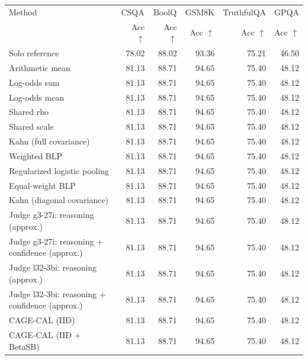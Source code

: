 \begin{tabular}{lrrrrr}
\toprule
Method & \multicolumn{1}{c}{CSQA} & \multicolumn{1}{c}{BoolQ} & \multicolumn{1}{c}{GSM8K} & \multicolumn{1}{c}{TruthfulQA} & \multicolumn{1}{c}{GPQA} \\
 & Acc $\uparrow$ & Acc $\uparrow$ & Acc $\uparrow$ & Acc $\uparrow$ & Acc $\uparrow$ \\
\midrule
Solo reference & 78.02 & 88.02 & 93.36 & 75.21 & 46.50 \\
Arithmetic mean & 81.13 & 88.71 & 94.65 & 75.40 & 48.12 \\
Log-odds sum & 81.13 & 88.71 & 94.65 & 75.40 & 48.12 \\
Log-odds mean & 81.13 & 88.71 & 94.65 & 75.40 & 48.12 \\
Shared rho & 81.13 & 88.71 & 94.65 & 75.40 & 48.12 \\
Shared scale & 81.13 & 88.71 & 94.65 & 75.40 & 48.12 \\
Kahn (full covariance) & 81.13 & 88.71 & 94.65 & 75.40 & 48.12 \\
Weighted BLP & 81.13 & 88.71 & 94.65 & 75.40 & 48.12 \\
Regularized logistic pooling & 81.13 & 88.71 & 94.65 & 75.40 & 48.12 \\
Equal-weight BLP & 81.13 & 88.71 & 94.65 & 75.40 & 48.12 \\
Kahn (diagonal covariance) & 81.13 & 88.71 & 94.65 & 75.40 & 48.12 \\
Judge g3-27i: reasoning (approx.) & 81.13 & 88.71 & 94.65 & 75.40 & 48.12 \\
Judge g3-27i: reasoning + confidence (approx.) & 81.13 & 88.71 & 94.65 & 75.40 & 48.12 \\
Judge l32-3bi: reasoning (approx.) & 81.13 & 88.71 & 94.65 & 75.40 & 48.12 \\
Judge l32-3bi: reasoning + confidence (approx.) & 81.13 & 88.71 & 94.65 & 75.40 & 48.12 \\
CAGE-CAL (IID) & 81.13 & 88.71 & 94.65 & 75.40 & 48.12 \\
CAGE-CAL (IID + BetaSB) & 81.13 & 88.71 & 94.65 & 75.40 & 48.12 \\
\bottomrule
\end{tabular}
